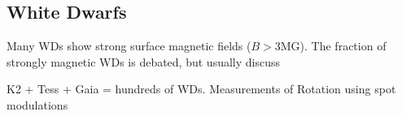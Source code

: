 {\color{red} \subsection{White Dwarfs}}
Many WDs show strong surface magnetic fields ($B>$3MG). The fraction of strongly magnetic WDs is debated, but usually discuss 

K2 + Tess + Gaia = hundreds of WDs. Measurements of Rotation using spot modulations